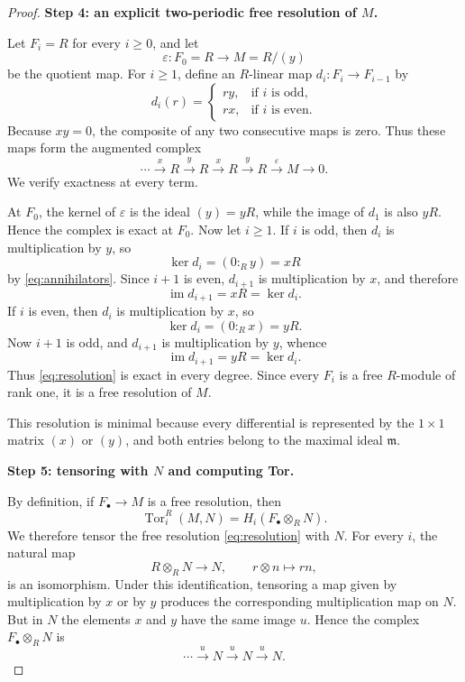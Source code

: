 \documentclass[a4paper]{amsart}
\theoremstyle{definition}
\theoremstyle{remark}
\numberwithin{equation}{section}
\newcommand{\Tor}{\operatorname{Tor}}
\begin{document}
\begin{proof}
\medskip
\noindent
\textbf{Step 4: an explicit two-periodic free resolution of $M$.}

Let $F_i=R$ for every $i\geq0$, and let
\[
 \varepsilon:F_0=R\longrightarrow M=R/(y)
\]
be the quotient map.  For $i\geq1$, define an $R$-linear map
$d_i:F_i\to F_{i-1}$ by
\[
 d_i(r)=
 \begin{cases}
  ry,&\text{if $i$ is odd},\\
  rx,&\text{if $i$ is even}.
 \end{cases}
\]
Because $xy=0$, the composite of any two consecutive maps is zero.
Thus these maps form the augmented complex
\begin{equation}\label{eq:resolution}
 \cdots\xrightarrow{\,x\,}R
 \xrightarrow{\,y\,}R
 \xrightarrow{\,x\,}R
 \xrightarrow{\,y\,}R
 \xrightarrow{\,\varepsilon\,}M
 \longrightarrow0.
\end{equation}
We verify exactness at every term.

At $F_0$, the kernel of $\varepsilon$ is the ideal $(y)=yR$, while the
image of $d_1$ is also $yR$.  Hence the complex is exact at $F_0$.
Now let $i\geq1$.
If $i$ is odd, then $d_i$ is multiplication by $y$, so
\[
 \ker d_i=(0:_R y)=xR
\]
by \eqref{eq:annihilators}.  Since $i+1$ is even, $d_{i+1}$ is
multiplication by $x$, and therefore
\[
 \operatorname{im}d_{i+1}=xR=\ker d_i.
\]
If $i$ is even, then $d_i$ is multiplication by $x$, so
\[
 \ker d_i=(0:_R x)=yR.
\]
Now $i+1$ is odd, and $d_{i+1}$ is multiplication by $y$, whence
\[
 \operatorname{im}d_{i+1}=yR=\ker d_i.
\]
Thus \eqref{eq:resolution} is exact in every degree.  Since every
$F_i$ is a free $R$-module of rank one, it is a free resolution of
$M$.

This resolution is minimal because every
differential is represented by the $1\times1$ matrix $(x)$ or $(y)$,
and both entries belong to the maximal ideal $\mathfrak m$.

\medskip
\noindent
\textbf{Step 5: tensoring with $N$ and computing Tor.}

By definition, if $F_\bullet\to M$ is a free resolution, then
\[
 \Tor_i^R(M,N)=H_i(F_\bullet\otimes_R N).
\]
We therefore tensor the free resolution \eqref{eq:resolution} with
$N$.  For every $i$, the natural map
\[
 R\otimes_R N\longrightarrow N,
 \qquad r\otimes n\longmapsto rn,
\]
is an isomorphism.  Under this identification, tensoring a map given by
multiplication by $x$ or by $y$ produces the corresponding
multiplication map on $N$.  But in $N$ the elements $x$ and $y$ have
the same image $u$.  Hence the complex $F_\bullet\otimes_R N$ is
\begin{equation}\label{eq:tensored-complex}
 \cdots\xrightarrow{\,u\,}N
 \xrightarrow{\,u\,}N
 \xrightarrow{\,u\,}N.
\end{equation}


\end{proof}
\end{document}
